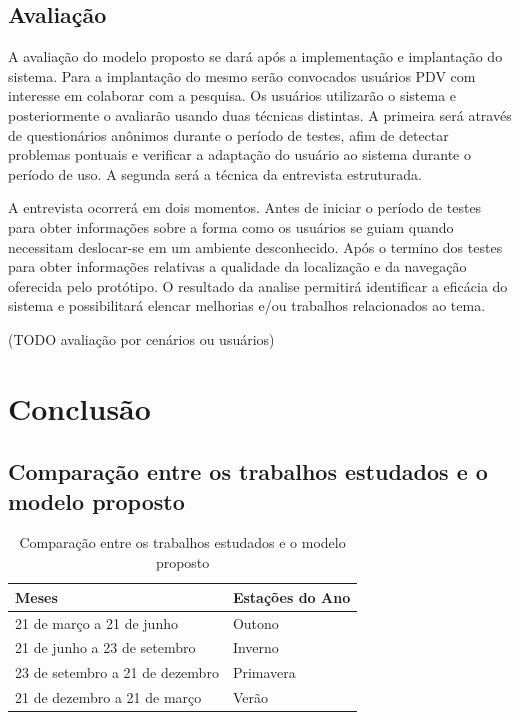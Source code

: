 \documentclass[english,brazilian]{UNISINOSmonografia}
\begin{document}
	\section{Avaliação}
A avaliação do modelo proposto se dará após a implementação e implantação do sistema. Para a implantação do mesmo serão convocados usuários PDV com interesse em colaborar com a pesquisa. Os usuários utilizarão o sistema e posteriormente o avaliarão usando duas técnicas distintas. A primeira será através de questionários anônimos durante o período de testes, afim de detectar problemas pontuais e verificar a adaptação do usuário ao sistema durante o período de uso. A segunda será a técnica da entrevista estruturada. 

A entrevista ocorrerá em dois momentos. Antes de iniciar o período de testes para obter informações sobre a forma como os usuários se guiam quando necessitam deslocar-se em um ambiente desconhecido. Após o termino dos testes para obter informações relativas a qualidade da localização e da navegação oferecida pelo protótipo. O resultado da analise permitirá identificar a eficácia do sistema e possibilitará elencar melhorias e/ou trabalhos relacionados ao tema.

(TODO avaliação por cenários ou usuários)

\chapter{Conclusão}

\section{Comparação entre os trabalhos estudados e o modelo proposto}

	\begin{table}
		\caption{Comparação entre os trabalhos estudados e o modelo proposto}
		\centering%
		\begin{minipage}{.6\textwidth}
			\begin{tabular*}{\textwidth}{ll}
				\hline
				\textbf{Meses} & \textbf{Estações do Ano}\\
				\hline
				21 de março a 21 de junho & Outono\\
				21 de junho a 23 de setembro & Inverno\\
				23 de setembro a 21 de dezembro & Primavera\\
				21 de dezembro a 21 de março & Verão\\
				\hline
			\end{tabular*}
		\end{minipage}
	\end{table}
	
\end{document}
